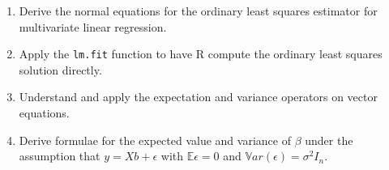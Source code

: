 \documentclass[11pt]{article}
\begin{document}
\begin{enumerate}
\item Derive the normal equations for the ordinary least squares estimator for
multivariate linear regression.

\item Apply the \verb|lm.fit| function to have R compute the ordinary least
squares solution directly.

\item Understand and apply the expectation and variance operators on vector
equations.

\item Derive formulae for the expected value and variance of $\beta$ under the
assumption that $y = Xb + \epsilon$ with $\mathbb{E}\epsilon = 0$ and
$\mathbb{V}ar(\epsilon) = \sigma^2 I_n$.

\end{enumerate}
\end{document}
